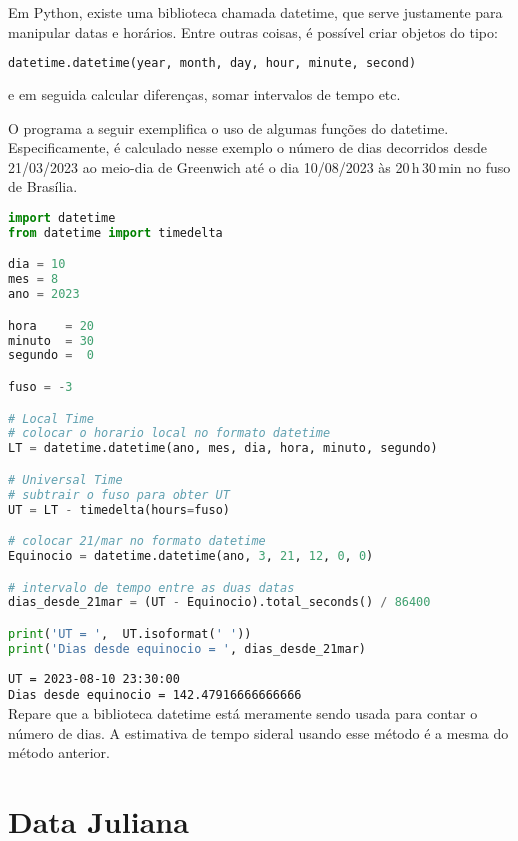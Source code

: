 Em Python, existe uma biblioteca chamada datetime, que serve justamente para manipular datas e horários. Entre outras coisas, é possível criar objetos do tipo:

\begin{lstlisting}[language=Python]
datetime.datetime(year, month, day, hour, minute, second)
\end{lstlisting}

\noindent e em seguida calcular diferenças, somar intervalos de tempo etc.

O programa a seguir exemplifica o uso de algumas funções do datetime. Especificamente, é calculado nesse exemplo o número de dias decorridos desde 21/03/2023 ao meio-dia de Greenwich até o dia 10/08/2023 às 20\,h\,30\,min no fuso de Brasília.

\begin{lstlisting}[language=Python]
import datetime
from datetime import timedelta

dia = 10
mes = 8
ano = 2023

hora    = 20 
minuto  = 30
segundo =  0

fuso = -3

# Local Time
# colocar o horario local no formato datetime
LT = datetime.datetime(ano, mes, dia, hora, minuto, segundo)

# Universal Time
# subtrair o fuso para obter UT
UT = LT - timedelta(hours=fuso)

# colocar 21/mar no formato datetime
Equinocio = datetime.datetime(ano, 3, 21, 12, 0, 0)

# intervalo de tempo entre as duas datas
dias_desde_21mar = (UT - Equinocio).total_seconds() / 86400

print('UT = ',  UT.isoformat(' '))
print('Dias desde equinocio = ', dias_desde_21mar)

\end{lstlisting}
\noindent\texttt{UT =  2023-08-10 23:30:00}\\
\noindent\texttt{Dias desde equinocio =  142.47916666666666}\\

Repare que a biblioteca datetime está meramente sendo usada para contar o número de dias. A estimativa de tempo sideral usando esse método é a mesma do método anterior.

\section{Data Juliana}
\label{sec:ts3}


